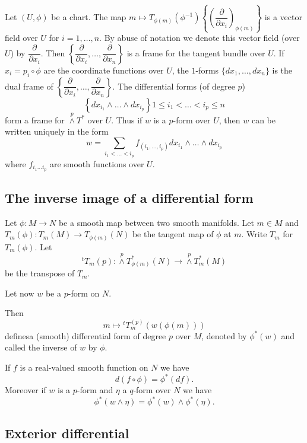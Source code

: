 Let $(U,\phi)$ be a chart. The map $m\mapsto T_{\phi(m)}(\phi^{-1})\left\{\left(\dfrac{\partial}{\partial x_{i}}\right)_{\phi(m)}\right\}$ is a vector field over $U$ for $i=1,\ldots,n$. By abuse of notation we denote this vector field (over $U$) by $\dfrac{\partial}{\partial x_{i}}$. Then $\left\{\dfrac{\partial}{\partial x_{i}},\ldots,\dfrac{\partial}{\partial x_{n}}\right\}$ is a frame for the tangent bundle over $U$. If $x_{i}=p_{i}\circ \phi$ are the coordinate functions over $U$, the $1$-forms $\{dx_{1},\ldots,dx_{n}\}$ is the dual frame of $\left\{\dfrac{\partial}{\partial x_{i}},\ldots,\dfrac{\partial}{\partial x_{n}}\right\}$. The differential forms (of degree $p$) 
$$
\left\{dx_{i_{1}}\wedge\ldots\wedge dx_{i_{p}}\right\}1\leq i_{1}<\ldots<i_{p}\leq n
$$
form a frame for ${\displaystyle{\mathop{\wedge}\limits^{p}}}T^{*}$ over $U$. Thus if $w$ is a $p$-form over $U$, then $w$ can be written uniquely in the form
$$
w=\sum\limits_{i_{1}<\ldots<i_{p}}f_{(i_{1},\ldots,i_{p})}dx_{i_{1}}\wedge\ldots\wedge dx_{i_{p}}
$$
where $f_{i_{1}\ldots i_{p}}$ are smooth functions over $U$.

\subsection*{The inverse image of a differential form}

Let $\phi:M\to N$ be a smooth map between two smooth manifolds. Let $m\in M$ and $T_{m}(\phi):T_{m}(M)\to T_{\phi(m)}(N)$ be the tangent map of $\phi$ at $m$. Write $T_{m}$ for $T_{m}(\phi)$. Let
$$
{}^{t}T_{m}(p): {\displaystyle{\mathop{\wedge}\limits^{p}}}T^{*}_{\phi(m)}(N)\to {\displaystyle{\mathop{\wedge}\limits^{p}}} T^{*}_{m}(M)
$$
be the transpose of $T_{m}$.

Let now $w$ be a $p$-form on $N$.

Then
$$
m\mapsto {}^{t}T^{(p)}_{m}(w(\phi(m)))
$$
defines\pageoriginale a (smooth) differential form of degree $p$ over $M$, denoted by $\phi^{*}(w)$ and called the inverse of $w$ by $\phi$.

If $f$ is a real-valued smooth function on $N$ we have 
$$
d(f\circ \phi)=\phi^{*}(df).
$$
Moreover if $w$ is a $p$-form and $\eta$ a $q$-form over $N$ we have 
$$
\phi^{*}(w\wedge \eta)=\phi^{*}(w)\wedge \phi^{*}(\eta).
$$

\subsection*{Exterior differential}

